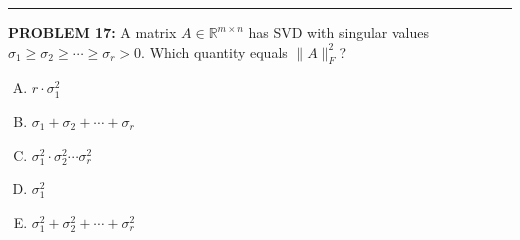 \documentclass[12pt]{amsart}
\newcommand{\divider}{
  \vspace{-1em} %
  \noindent
  \raisebox{-0.15ex}{\textbullet}%
  \hspace{0.5em}%
  \rule[0.5ex]{0.95\textwidth}{1.0pt}%
  \hspace{0.5em}%
  \raisebox{-0.15ex}{\textbullet}%
  \vspace{0em} %
}
\begin{document}
%

\divider

{\bf PROBLEM 17:}
%
A matrix $A \in \mathbb{R}^{m \times n}$ has SVD with singular values
$\sigma_1 \geq \sigma_2 \geq \cdots \geq \sigma_r > 0$. 
Which quantity equals $\|A\|_F^2$?

\begin{enumerate}[(A)]
\item $r \cdot \sigma_1^2$
\item $\sigma_1 + \sigma_2 + \cdots + \sigma_r$
\item $\sigma_1^2 \cdot \sigma_2^2 \cdots \sigma_r^2$
\item $\sigma_1^2$
\item $\sigma_1^2 + \sigma_2^2 + \cdots + \sigma_r^2$
\end{enumerate}
\end{document}
